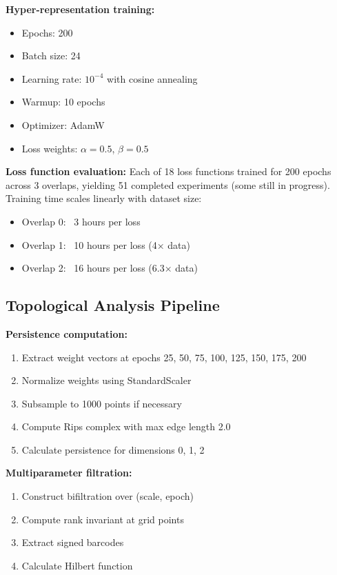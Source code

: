 \textbf{Hyper-representation training:}
\begin{itemize}
    \item Epochs: 200
    \item Batch size: 24
    \item Learning rate: $10^{-4}$ with cosine annealing
    \item Warmup: 10 epochs
    \item Optimizer: AdamW
    \item Loss weights: $\alpha = 0.5$, $\beta = 0.5$
\end{itemize}

\textbf{Loss function evaluation:}
Each of 18 loss functions trained for 200 epochs across 3 overlaps, yielding 51 completed experiments (some still in progress). Training time scales linearly with dataset size:
\begin{itemize}
    \item Overlap 0: ~3 hours per loss
    \item Overlap 1: ~10 hours per loss (4× data)
    \item Overlap 2: ~16 hours per loss (6.3× data)
\end{itemize}

\subsection{Topological Analysis Pipeline}

\textbf{Persistence computation:}
\begin{enumerate}
    \item Extract weight vectors at epochs 25, 50, 75, 100, 125, 150, 175, 200
    \item Normalize weights using StandardScaler
    \item Subsample to 1000 points if necessary
    \item Compute Rips complex with max edge length 2.0
    \item Calculate persistence for dimensions 0, 1, 2
\end{enumerate}

\textbf{Multiparameter filtration:}
\begin{enumerate}
    \item Construct bifiltration over (scale, epoch)
    \item Compute rank invariant at grid points
    \item Extract signed barcodes
    \item Calculate Hilbert function
\end{enumerate}

